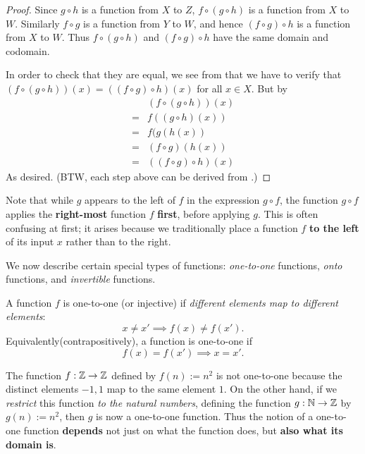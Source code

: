 \begin{proof}
Since \(g \circ h\) is a function from \(X\) to \(Z\), \(f \circ (g \circ h)\) is a function from \(X\) to \(W\). Similarly \(f \circ g\) is a function from \(Y\) to \(W\), and hence \((f \circ g) \circ h\) is a function from \(X\) to \(W\). Thus \(f \circ (g \circ h)\) and \((f \circ g) \circ h\) have the same domain and codomain.

In order to check that they are equal, we see from  that we have to verify that \((f \circ (g \circ h))(x) = ((f \circ g) \circ h)(x)\) for all \(x \in X\). But by 
\begin{align*}
      & (f \circ (g \circ h))(x) \\
    = & f((g \circ h)(x)) \\
    = & f(g(h(x)) \\
    = & (f \circ g)(h(x)) \\
    = & ((f \circ g) \circ h)(x)
\end{align*}
As desired. (BTW, each step above can be derived from .)
\end{proof}

\begin{remark} \label{remark 3.3.13}
Note that while \(g\) appears to the left of \(f\) in the expression \(g \circ f\), the function \(g \circ f\) applies the \textbf{right-most} function \(f\)
\textbf{first}, before applying \(g\). This is often confusing at first; it arises because we traditionally place a function \(f\) \textbf{to the left} of its input \(x\) rather than to the right.
\end{remark}

We now describe certain special types of functions: \emph{one-to-one} functions, \emph{onto} functions, and \emph{invertible} functions.

\begin{definition}  \label{def 3.3.14}
A function \(f\) is one-to-one (or injective) if \emph{different elements map to different elements}:
\[
x \neq x' \implies f(x) \neq f(x').
\]
Equivalently(contrapositively), a function is one-to-one if
\[
    f(x) = f(x') \implies x = x'.
\]
\end{definition}

\begin{example} [Informal] \label{example 3.3.15}
The function \(f : \mathbb{Z} \rightarrow \mathbb{Z}\) defined by \(f(n) := n^2\) is not one-to-one because the distinct elements \(-1, 1\) map to the same element \(1\). On the other hand, if we \emph{restrict} this function \emph{to the natural numbers}, defining the function \(g : \mathbb{N} \rightarrow \mathbb{Z}\) by \(g(n) := n^2\), then \(g\) is now a one-to-one function. Thus the notion of a one-to-one function \textbf{depends} not just on what the function does, but \textbf{also what its domain is}.
\end{example}

